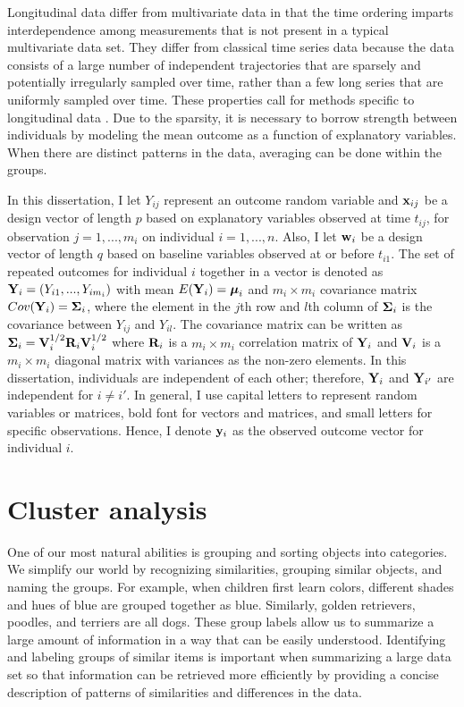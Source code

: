 Longitudinal data differ from multivariate data in that the time ordering imparts interdependence among measurements that is not present in a typical multivariate data set. They differ from classical time series data because the data consists of a large number of independent trajectories that are sparsely and potentially irregularly sampled over time, rather than a few long series that are uniformly sampled over time. These properties call for methods specific to longitudinal data \cite{diggle2002}. Due to the sparsity, it is necessary to borrow strength between individuals by modeling the mean outcome as a function of explanatory variables. When there are distinct patterns in the data, averaging can be done within the groups.

In this dissertation, I let $Y_{ij}$ represent an outcome random variable and $\mathbf x_{ij}$ be a design vector of length $p$ based on explanatory variables observed at time $t_{ij}$, for observation $j=1,...,m_{i}$ on individual $i=1,...,n$. Also, I let $\mathbf w_{i}$ be a design vector of length $q$ based on baseline variables observed at or before $t_{i1}$. The set of repeated outcomes for individual $i$ together in a vector is denoted as $\mathbf Y_{i} = (Y_{i1},...,Y_{im_{i}})$ with mean $E(\mathbf Y_{i}) = \boldsymbol\mu_{i}$ and $m_{i}\times m_{i}$ covariance matrix $Cov(\mathbf Y_{i}) = \boldsymbol\Sigma_{i}$, where the element in the $j$th row and $l$th column of $\boldsymbol\Sigma_{i}$ is the covariance between $Y_{ij}$ and $Y_{il}$. The covariance matrix can be written as $\boldsymbol\Sigma_{i}=\mathbf V_{i}^{1/2}\mathbf R_{i}\mathbf V_{i}^{1/2}$ where $\mathbf R_{i}$ is a $m_{i}\times m_{i}$ correlation matrix of $\mathbf Y_{i}$ and $\mathbf V_{i}$ is a $m_{i}\times m_{i}$ diagonal matrix with variances as the non-zero elements. In this dissertation, individuals are independent of each other; therefore, $\mathbf Y_{i}$ and $\mathbf Y_{i'}$ are independent for $i\not = i'$. In general, I use capital letters to represent random variables or matrices, bold font for vectors and matrices, and small letters for specific observations. Hence, I denote $\mathbf y_{i}$ as the observed outcome vector for individual $i$. 

\section{Cluster analysis}
One of our most natural abilities is grouping and sorting objects into categories. We simplify our world by recognizing similarities, grouping similar objects, and naming the groups. For example, when children first learn colors, different shades and hues of blue are grouped together as blue. Similarly, golden retrievers, poodles, and terriers are all dogs. These group labels allow us to summarize a large amount of information in a way that can be easily understood. Identifying and labeling groups of similar items is important when summarizing a large data set so that information can be retrieved more efficiently by providing a concise description of patterns of similarities and differences in the data. 

